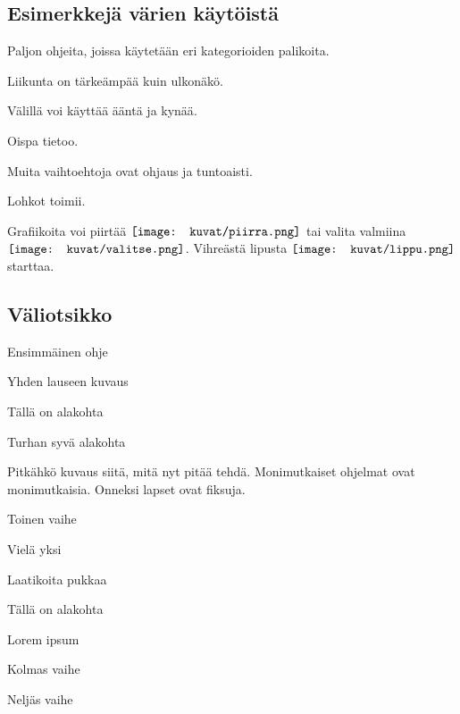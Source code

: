 \documentclass[12pt,twoside]{article}
\newenvironment{vaihetaso1}{%
    \LARGE
    \itemize
}{%
    \enditemize
}
\newenvironment{vaihetaso2}{%
    \Large
    \itemize
}{%
    \enditemize
}
\newenvironment{vaihetaso3}{%
    \large
    \itemize
}{%
    \enditemize
}
\newcommand{\valitse}{\ensuremath{%
  \mathchoice{\texttt{[image: kuvat/valitse.png]}}
    {\texttt{[image: kuvat/valitse.png]}}
    {\texttt{[image: kuvat/valitse.png]}}
    {\texttt{[image: kuvat/valitse.png]}}
}}
\newcommand{\piirra}{\ensuremath{%
  \mathchoice{\texttt{[image: kuvat/piirra.png]}}
    {\texttt{[image: kuvat/piirra.png]}}
    {\texttt{[image: kuvat/piirra.png]}}
    {\texttt{[image: kuvat/piirra.png]}}
}}
\newcommand{\lippu}{\ensuremath{%
  \mathchoice{\texttt{[image: kuvat/lippu.png]}}
    {\texttt{[image: kuvat/lippu.png]}}
    {\texttt{[image: kuvat/lippu.png]}}
    {\texttt{[image: kuvat/lippu.png]}}
}}
\begin{document}
\subsection*{Esimerkkejä värien käytöistä}
\begin{vaihetaso1}
	\item Paljon ohjeita, joissa käytetään eri kategorioiden palikoita.
	\item \textcolor{liike}{Liikunta} on tärkeämpää kuin \textcolor{ulkonako}{ulkonäkö}. 
	\begin{vaihetaso2}
		\item Välillä voi käyttää \textcolor{aani}{ääntä} ja \textcolor{kyna}{kynää}.
		\item Oispa \textcolor{tieto}{tietoo}.
		\begin{vaihetaso3}
			\item Muita vaihtoehtoja ovat \textcolor{ohjaus}{ohjaus} ja \textcolor{tuntoaisti}{tuntoaisti}.
		\end{vaihetaso3}
	\end{vaihetaso2}
	\item \textcolor{lohkot}{Lohkot} \textcolor{toiminnot}{toimii}.
	
	\item Grafiikoita voi piirtää $\piirra$ tai valita valmiina $\valitse$. Vihreästä lipusta $\lippu$ starttaa.
\end{vaihetaso1}

\subsection*{Väliotsikko}

\begin{vaihetaso1}
	\item Ensimmäinen ohje
	\begin{vaihetaso2}
		\item Yhden lauseen kuvaus
		\item Tällä on alakohta
		\begin{vaihetaso3}
			\item Turhan syvä alakohta
		\end{vaihetaso3}
		\item Pitkähkö kuvaus siitä, mitä nyt pitää tehdä. Monimutkaiset ohjelmat ovat monimutkaisia. Onneksi lapset ovat fiksuja.
	\end{vaihetaso2}
	\item Toinen vaihe
	\item Vielä yksi
	\begin{vaihetaso2}
		\item Laatikoita pukkaa
		\item Tällä on alakohta
		\item Lorem ipsum
	\end{vaihetaso2}
	\item Kolmas vaihe
	\item Neljäs vaihe
\end{vaihetaso1}
\end{document}

